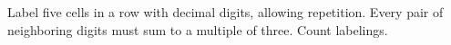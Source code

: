 Label five cells in a row with decimal digits, allowing repetition. Every pair of neighboring digits must sum to a multiple of three. Count labelings.
